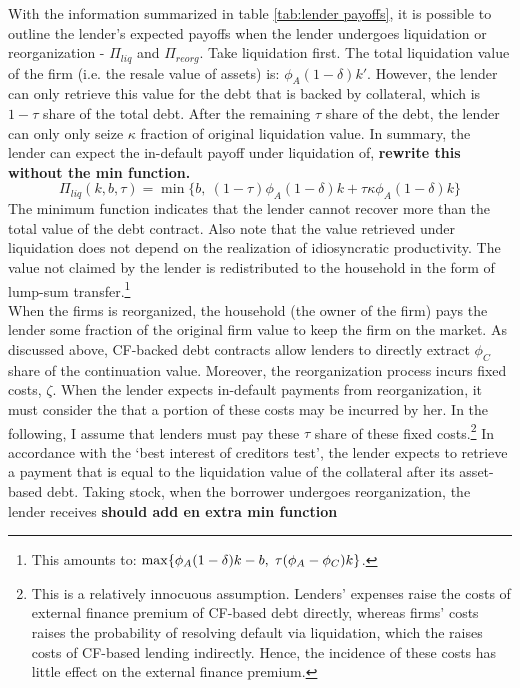 \documentclass[12pt]{article}
\begin{document}
\noindent With the information summarized in table \ref{tab:lender payoffs}, it is possible to outline the lender's expected payoffs when the lender undergoes liquidation or reorganization - $\Pi_{liq}$ and $\Pi_{reorg}$. Take liquidation first. The total liquidation value of the firm (i.e. the resale value of assets) is: $\phi_A (1-\delta) k'$. However, the lender can only retrieve this value for the  debt that is backed by collateral, which is $1-\tau$ share of the total debt. After the remaining $\tau$ share of the debt, the lender can only only seize $\kappa$ fraction of original liquidation value. In summary, the lender can expect the in-default payoff under liquidation of, \textbf{rewrite this without the min function.}
\begin{equation} \label{eq:P_liq} 
   \Pi_{liq}(k,b,\tau) = \min\{b, \ (1-\tau) \phi_A (1-\delta) k +\tau \kappa \phi_A  (1-\delta) k \}
\end{equation}
The minimum function indicates that the lender cannot recover more than the total value of the debt contract. Also note that the value retrieved under liquidation does not depend on the realization of idiosyncratic productivity. The value not claimed by the lender is redistributed to the household in the form of lump-sum transfer.\footnote{This amounts to: $ \max \{\phi_A (1-\delta) k - b, \hspace{1mm} \tau (\phi_A-\phi_C) k  \} $.} \vspace{3mm} \\
When the firms is reorganized, the household (the owner of the firm) pays the lender some fraction of the original firm value to keep the firm on the market. As discussed above, CF-backed debt contracts allow lenders to directly extract $\phi_C$ share of the continuation value. Moreover, the reorganization process incurs fixed costs, $\zeta$. When the lender expects in-default payments from reorganization, it must consider the that a portion of these costs may be incurred by her. In the following, I assume that lenders must pay these $\tau$ share of these fixed costs.\footnote{This is a relatively innocuous assumption. Lenders' expenses raise the costs of external finance premium of CF-based debt directly, whereas firms' costs raises the probability of resolving default via liquidation, which the raises costs of CF-based lending indirectly. Hence, the incidence of these costs has little effect on the external finance premium.} In accordance with the `best interest of creditors test', the lender expects to retrieve a payment that is equal to the liquidation value of the collateral after its asset-based debt. Taking stock, when the borrower undergoes reorganization, the lender receives \textbf{should add en extra min function}
\end{document}
